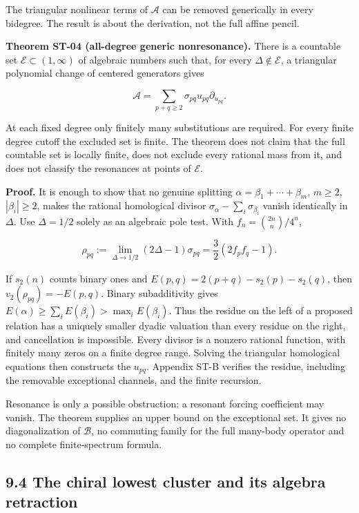 The triangular nonlinear terms of \(\mathscr A\) can be removed generically in every bidegree. The result is about the derivation, not the full affine pencil.

\textbf{Theorem ST-04 (all-degree generic nonresonance).} There is a countable set \(\mathcal E\subset(1,\infty)\) of algebraic numbers such that, for every \(\Delta\notin\mathcal E\), a triangular polynomial change of centered generators gives

\[
\mathscr A=\sum_{p+q\geq2}\sigma_{pq}u_{pq}\partial_{u_{pq}}.
\]

At each fixed degree only finitely many substitutions are required. For every finite degree cutoff the excluded set is finite. The theorem does not claim that the full countable set is locally finite, does not exclude every rational mass from it, and does not classify the resonances at points of \(\mathcal E\).

\textbf{Proof.} It is enough to show that no genuine splitting \(\alpha=\beta_1+\cdots+\beta_m\), \(m\geq2\), \(|\beta_i|\geq2\), makes the rational homological divisor \(\sigma_\alpha-\sum_i\sigma_{\beta_i}\) vanish identically in \(\Delta\). Use \(\Delta=1/2\) solely as an algebraic pole test. With \(f_n=\binom{2n}{n}/4^n\),

\[
\rho_{pq}:=\lim_{\Delta\to1/2}(2\Delta-1)\sigma_{pq}
=\frac32(2f_pf_q-1).
\]

If \(s_2(n)\) counts binary ones and \(E(p,q)=2(p+q)-s_2(p)-s_2(q)\), then \(v_2(\rho_{pq})=-E(p,q)\). Binary subadditivity gives \(E(\alpha)\geq\sum_iE(\beta_i)>\max_iE(\beta_i)\). Thus the residue on the left of a proposed relation has a uniquely smaller dyadic valuation than every residue on the right, and cancellation is impossible. Every divisor is a nonzero rational function, with finitely many zeros on a finite degree range. Solving the triangular homological equations then constructs the \(u_{pq}\). Appendix ST-B verifies the residue, including the removable exceptional channels, and the finite recursion.

Resonance is only a possible obstruction: a resonant forcing coefficient may vanish. The theorem supplies an upper bound on the exceptional set. It gives no diagonalization of \(\mathscr B\), no commuting family for the full many-body operator and no complete finite-spectrum formula.

\hypertarget{the-chiral-lowest-cluster-and-its-algebra-retraction}{%
\subsection{9.4 The chiral lowest cluster and its algebra retraction}\label{the-chiral-lowest-cluster-and-its-algebra-retraction}}

